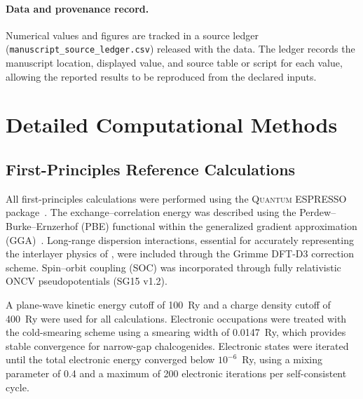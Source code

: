 \documentclass[pdflatex,sn-mathphys-num]{sn-jnl}%
\theoremstyle{thmstyleone}%
\theoremstyle{thmstyletwo}%
\theoremstyle{thmstylethree}%
\begin{document}
\paragraph{Data and provenance record.}
Numerical values and figures are tracked in a source ledger (\texttt{manuscript\_source\_ledger.csv}) released with the data. The ledger records the manuscript location, displayed value, and source table or script for each value, allowing the reported results to be reproduced from the declared inputs.


\newcommand{\pc}[1]{{\color{purple}[Paulette: #1]}}
\newcommand{\yi}[1]{{\color{orange!80}[Yi: #1]}}


\section{Detailed Computational Methods}
\subsection{First-Principles Reference Calculations}

All first-principles calculations were performed using the \textsc{Quantum ESPRESSO} package~\cite{giannozzi2009quantum}. The exchange–correlation energy was described using the Perdew–Burke–Ernzerhof (PBE) functional within the generalized gradient approximation (GGA)~\cite{perdew1996generalized}. Long-range dispersion interactions, essential for accurately representing the interlayer physics of , were included through the Grimme DFT-D3 correction scheme. Spin–orbit coupling (SOC) was incorporated through fully relativistic ONCV pseudopotentials (SG15 v1.2).

A plane-wave kinetic energy cutoff of 100~Ry and a charge density cutoff of 400~Ry were used for all calculations. Electronic occupations were treated with the cold-smearing scheme using a smearing width of 0.0147~Ry, which provides stable convergence for narrow-gap chalcogenides. Electronic states were iterated until the total electronic energy converged below $10^{-6}$~Ry, using a mixing parameter of 0.4 and a maximum of 200 electronic iterations per self-consistent cycle.
\end{document}
